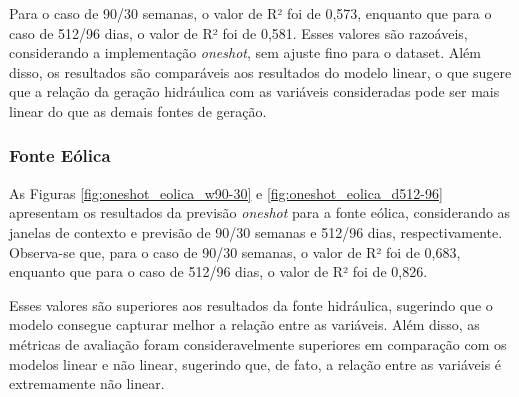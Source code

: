 Para o caso de 90/30 semanas, o valor de R² foi de 0,573, enquanto que para o caso de 512/96 dias, o valor de R² foi de 0,581.
Esses valores são razoáveis, considerando a implementação \textit{oneshot}, sem ajuste fino para o dataset. Além disso, os
resultados são comparáveis aos resultados do modelo linear, o que sugere que a relação da geração hidráulica com as variáveis 
consideradas pode ser mais linear do que as demais fontes de geração.

\subsubsection{Fonte Eólica}
\begin{figure}[!ht]
  {}
  {}
\end{figure}
\begin{figure}[!ht]
  {}
  {}
\end{figure}
As Figuras \ref{fig:oneshot_eolica_w90-30} e \ref{fig:oneshot_eolica_d512-96} apresentam os resultados da previsão
\textit{oneshot} para a fonte eólica, considerando as janelas de contexto e previsão de 90/30 semanas e 512/96 dias, respectivamente.
Observa-se que, para o caso de 90/30 semanas, o valor de R² foi de 0,683, enquanto que para o caso de 512/96 dias, o valor de R² foi de 0,826.

Esses valores são superiores aos resultados da fonte hidráulica, sugerindo que o modelo consegue capturar melhor a relação
entre as variáveis. Além disso, as métricas de avaliação foram consideravelmente superiores em comparação com os modelos
linear e não linear, sugerindo que, de fato, a relação entre as variáveis é extremamente não linear.

